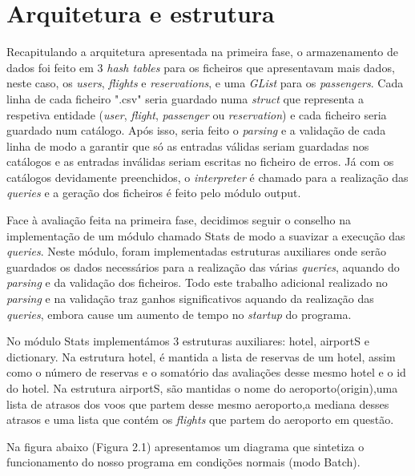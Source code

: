 \documentclass[12pt,a4paper]{report}
\begin{document}
    \chapter{Arquitetura e estrutura}
    \par Recapitulando a arquitetura apresentada na primeira fase, o armazenamento de dados foi feito em 3 \textit{hash tables} para os ficheiros que apresentavam mais dados, neste caso, os \textit{users}, \textit{flights} e \textit{reservations}, e uma \textit{GList} para os \textit{passengers}. Cada linha de cada ficheiro ".csv" seria guardado numa \textit{struct} que representa a respetiva entidade (\textit{user}, \textit{flight}, \textit{passenger} ou \textit{reservation}) e cada ficheiro seria guardado num catálogo. Após isso, seria feito o \textit{parsing} e a validação de cada linha de modo a garantir que só as entradas válidas seriam guardadas nos catálogos e as entradas inválidas seriam escritas no ficheiro de erros. Já com os catálogos devidamente preenchidos, o \textit{interpreter} é chamado para a realização das \textit{queries} e a geração dos ficheiros é feito pelo módulo output.
    \par Face à avaliação feita na primeira fase, decidimos seguir o conselho na implementação de um módulo chamado Stats de modo a suavizar a execução das \textit{queries}. Neste módulo, foram implementadas estruturas auxiliares onde serão guardados os dados necessários para a realização das várias \textit{queries}, aquando do \textit{parsing} e da validação dos ficheiros. Todo este trabalho adicional realizado no \textit{parsing} e na validação traz ganhos significativos aquando da realização das \textit{queries}, embora cause um aumento de tempo no \textit{startup} do programa.
    \par No módulo Stats implementámos 3 estruturas auxiliares: hotel, airportS e dictionary. Na estrutura hotel, é mantida a lista de reservas de um hotel, assim como o número de reservas e o somatório das avaliações desse mesmo hotel e o {id} do hotel. Na estrutura airportS, são mantidas o nome do aeroporto(origin),uma lista de atrasos dos voos que partem desse mesmo aeroporto,a mediana desses atrasos e uma lista que contém os \textit{flights} que partem do aeroporto em questão. 
\newpage

Na figura abaixo (Figura 2.1) apresentamos um diagrama que sintetiza o funcionamento do nosso programa em condições normais (modo Batch).
\end{document}
